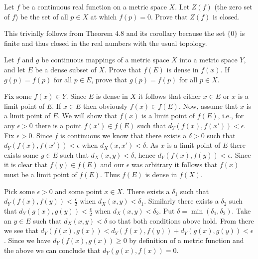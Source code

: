 \begin{problem}
  Let $f$ be a continuous real function on a metric space $X$.
  Let $Z(f)$ (the zero set of $f$) be the set of all $p \in X$ at which $f(p) = 0$.
  Prove that $Z(f)$ is closed.
\end{problem}

\begin{solution}
  This trivially follows from Theorem 4.8 and its corollary because the set $\{0\}$ is finite and thus closed in the real numbers with the usual topology.
\end{solution}

\begin{problem}
  Let $f$ and $g$ be continuous mappings of a metric space $X$ into a metric space $Y$, and let $E$ be a dense subset of $X$.
  Prove that $f(E)$ is dense in $f(x)$.
  If $g(p) = f(p)$ for all $p \in E$, prove that $g(p) = f(p)$ for all $p \in X$.
\end{problem}

\begin{solution}
  Fix some $f(x) \in Y$.
  Since $E$ is dense in $X$ it follows that either $x \in E$ or $x$ is a limit point of $E$.
  If $x \in E$ then obviously $f(x) \in f(E)$.
  Now, assume that $x$ is a limit point of $E$.
  We will show that $f(x)$ is a limit point of $f(E)$, i.e., for any $\epsilon > 0$ there is a point $f(x') \in f(E)$ such that $d_Y (f(x), f(x')) < \epsilon$.
  Fix $\epsilon > 0$.
  Since $f$ is continuous we know that there exists a $\delta > 0$ such that $d_Y (f(x), f(x')) < \epsilon$ when $d_X (x, x') < \delta$.
  As $x$ is a limit point of $E$ there exists some $y \in E$ such that $d_X (x, y) < \delta$, hence $d_Y (f(x), f(y)) < \epsilon$.
  Since it is clear that $f(y) \in f(E)$ and our $\epsilon$ was arbitrary it follows that $f(x)$ must be a limit point of $f(E)$.
  Thus $f(E)$ is dense in $f(X)$.

  Pick some $\epsilon > 0$ and some point $x \in X$.
  There exists a $\delta_1$ such that $d_Y (f(x), f(y)) < \frac{\epsilon}{2}$ when $d_X (x, y) < \delta_1$.
  Similarly there exists a $\delta_2$ such that $d_Y (g(x), g(y)) < \frac{\epsilon}{2}$ when $d_X (x, y) < \delta_2$.
  Put $\delta = \min (\delta_1, \delta_2)$.
  Take an $y \in E$ such that $d_X (x, y) < \delta$ so that both conditions above hold.
  From there we see that $d_Y (f(x), g(x)) < d_Y (f(x), f(y)) + d_Y (g(x), g(y)) < \epsilon$.
  Since we have $d_Y (f(x), g(x)) \ge 0$ by definition of a metric function and the above we can conclude that $d_Y (g(x), f(x)) = 0$.
\end{solution}

